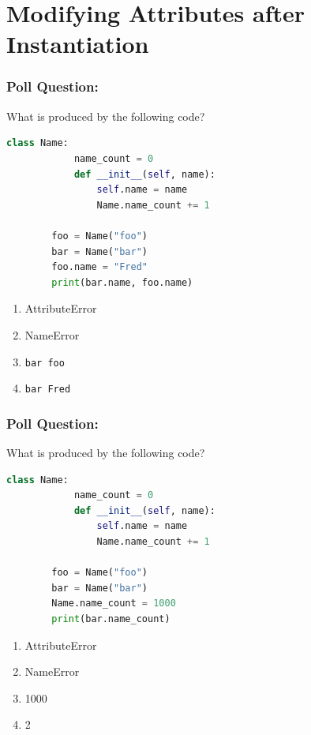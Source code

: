 \documentclass{beamer}
\begin{document}
\section{Modifying Attributes after Instantiation}
%
%
%
\begin{frame}[fragile]
    \frametitle{Poll Question: }
    \begin{minipage}{0.69\textwidth}
        What is produced by the following code?
        \begin{lstlisting}[language=Python, autogobble, basicstyle=\tiny]
        class Name:
            name_count = 0
            def __init__(self, name):
                self.name = name
                Name.name_count += 1

        foo = Name("foo")
        bar = Name("bar")
        foo.name = "Fred"
        print(bar.name, foo.name)
        \end{lstlisting}
    \end{minipage}
    \hfill
    \begin{minipage}{0.29\textwidth}
        \begin{enumerate}[A]
            \item AttributeError
            \item NameError
            \item \lstinline|bar foo|
            \item \lstinline|bar Fred|
        \end{enumerate}
    \end{minipage}
\end{frame}

%
%
%
\begin{frame}[fragile]
    \frametitle{Poll Question: }
    \begin{minipage}{0.69\textwidth}
        What is produced by the following code?
        \begin{lstlisting}[language=Python, autogobble, basicstyle=\tiny]
        class Name:
            name_count = 0
            def __init__(self, name):
                self.name = name
                Name.name_count += 1

        foo = Name("foo")
        bar = Name("bar")
        Name.name_count = 1000
        print(bar.name_count)
        \end{lstlisting}
    \end{minipage}
    \hfill
    \begin{minipage}{0.29\textwidth}
        \begin{enumerate}[A]
            \item AttributeError
            \item NameError
            \item 1000
            \item 2
        \end{enumerate}
    \end{minipage}
\end{frame}
\end{document}

